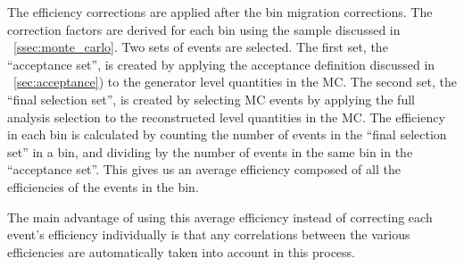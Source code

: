 The efficiency corrections are applied after the bin migration corrections. The
correction factors are derived for each \phistar bin using the \Ztoee \MADGRAPH
sample discussed in \SEC~\ref{ssec:monte_carlo}. Two sets of events are
selected. The first set, the ``acceptance set'', is created by applying the
acceptance definition discussed in \SEC~\ref{sec:acceptance}) to the generator
level quantities in the MC. The second set, the ``final selection set'', is
created by selecting MC events by applying the full analysis selection to the
reconstructed level quantities in the MC. The efficiency in each \phistar bin
is calculated by counting the number of events in the ``final selection set''
in a bin, and dividing by the number of events in the same bin in the
``acceptance set''. This gives us an average efficiency composed of all the
efficiencies of the events in the bin.

The main advantage of using this average efficiency instead of correcting each
event's efficiency individually is that any correlations between the various
efficiencies are automatically taken into account in this process.


